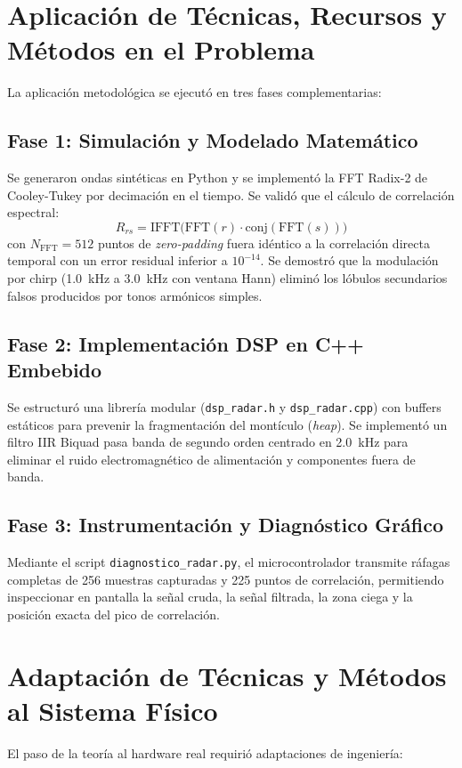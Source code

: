\documentclass[journal]{IEEEtran}
\begin{document}
\section{Aplicaci\'on de T\'ecnicas, Recursos y M\'etodos en el Problema}
La aplicaci\'on metodol\'ogica se ejecut\'o en tres fases complementarias:

\subsection{Fase 1: Simulaci\'on y Modelado Matem\'atico}
Se generaron ondas sint\'eticas en Python y se implement\'o la FFT Radix-2 de Cooley-Tukey por decimaci\'on en el tiempo. Se valid\'o que el c\'alculo de correlaci\'on espectral:
\begin{equation}
R_{rs} = \text{IFFT}\Big( \text{FFT}(r) \cdot \text{conj}(\text{FFT}(s)) \Big)
\end{equation}
con $N_{\text{FFT}} = 512$ puntos de \textit{zero-padding} fuera id\'entico a la correlaci\'on directa temporal con un error residual inferior a $10^{-14}$. Se demostr\'o que la modulaci\'on por chirp (1.0~kHz a 3.0~kHz con ventana Hann) elimin\'o los l\'obulos secundarios falsos producidos por tonos arm\'onicos simples.

\subsection{Fase 2: Implementaci\'on DSP en C++ Embebido}
Se estructur\'o una librer\'ia modular (\texttt{dsp\_radar.h} y \texttt{dsp\_radar.cpp}) con buffers est\'aticos para prevenir la fragmentaci\'on del mont\'iculo (\textit{heap}). Se implement\'o un filtro IIR Biquad pasa banda de segundo orden centrado en 2.0~kHz para eliminar el ruido electromagn\'etico de alimentaci\'on y componentes fuera de banda.

\subsection{Fase 3: Instrumentaci\'on y Diagn\'ostico Gr\'afico}
Mediante el script \texttt{diagnostico\_radar.py}, el microcontrolador transmite r\'afagas completas de 256 muestras capturadas y 225 puntos de correlaci\'on, permitiendo inspeccionar en pantalla la se\~nal cruda, la se\~nal filtrada, la zona ciega y la posici\'on exacta del pico de correlaci\'on.

\section{Adaptaci\'on de T\'ecnicas y M\'etodos al Sistema F\'isico}
El paso de la teor\'ia al hardware real requiri\'o adaptaciones de ingenier\'ia:
\end{document}
